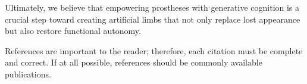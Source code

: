 \documentclass[letterpaper, 10 pt, conference]{ieeeconf}  %
\begin{document}
Ultimately, we believe that empowering prostheses with generative cognition is a crucial step toward creating artificial limbs that not only replace lost appearance but also restore functional autonomy.

\addtolength{\textheight}{-12cm}   %














References are important to the reader; therefore, each citation must be complete and correct. If at all possible, references should be commonly available publications.



\printbibliography
\end{document}
